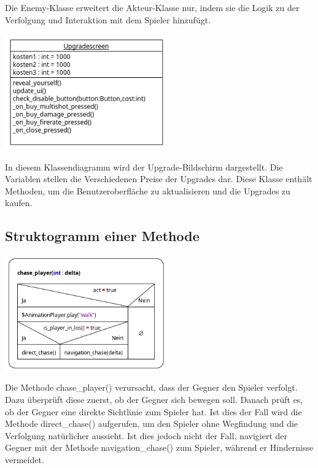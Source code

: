 \documentclass{article}
\begin{document}
	Die Enemy-Klasse erweitert die Akteur-Klasse nur, indem sie die Logik zu der Verfolgung und Interaktion mit dem Spieler hinzufügt.\\
	
	\begin{centering}
		\includegraphics[width=7cm]{klassendiagramm2.png}\\
	\end{centering}
	In diesem Klassendiagramm wird der Upgrade-Bildschirm dargestellt. Die Variablen stellen die Verschiedenen Preise der Upgrades dar. Diese Klasse enthält Methoden, um die Benutzeroberfläche zu aktualisieren und die Upgrades zu kaufen.
	
	\subsection{Struktogramm einer Methode}

	\begin{centering}
		\includegraphics[width=7cm]{chase.png}\\
	\end{centering}
	Die Methode chase\_player() verursacht, dass der Gegner den Spieler verfolgt. Dazu überprüft diese zuerst, ob der Gegner sich bewegen soll. Danach prüft es, ob der Gegner eine direkte Sichtlinie zum Spieler hat. Ist dies der Fall wird die Methode direct\_chase() aufgerufen, um den Spieler ohne Wegfindung und die Verfolgung natürlicher aussieht. Ist dies jedoch nicht der Fall, navigiert der Gegner mit der Methode navigation\_chase() zum Spieler, während er Hindernisse vermeidet.\\
	
\end{document}
